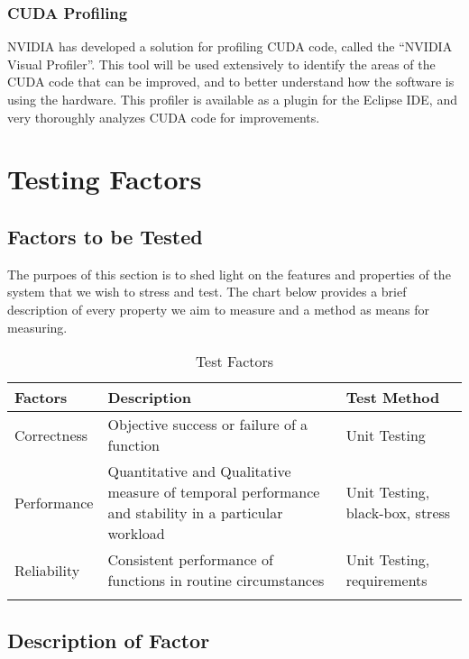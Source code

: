 \documentclass[12pt]{article}
\begin{document}
\subsubsection{CUDA Profiling}
NVIDIA has developed a solution for profiling CUDA code, called the ``NVIDIA Visual Profiler''. This tool will be used extensively to identify the areas of the CUDA code that can be improved, and to better understand how the software is using the hardware. This profiler is available as a plugin for the Eclipse IDE, and very thoroughly analyzes CUDA code for improvements.

\section{Testing Factors}

\subsection{Factors to be Tested} %
The purpoes of this section is to shed light on the features and properties of the system that we wish to stress and test. The chart below provides a brief description of every property we aim to measure and a method as means for measuring.\\

\begin{table}[h]
\centering
\caption{Test Factors}
\begin{tabular}{>{\raggedright\arraybackslash}p{}>{\raggedright\arraybackslash}p{}>{\raggedright\arraybackslash}p{}}
\Xhline{2\arrayrulewidth}
\bf Factors & \bf Description & \bf Test Method\\\hline
Correctness & Objective success or failure of a function & Unit Testing\\\hline
Performance & Quantitative and Qualitative measure of temporal performance and stability in a particular workload & Unit Testing, black-box, stress\\\hline
Reliability & Consistent performance of functions in routine circumstances & Unit Testing, requirements\\\hline
\Xhline{2\arrayrulewidth}
\end{tabular}
\end{table}
\subsection{Description of Factor} %
\end{document}
